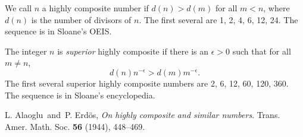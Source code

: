 \documentclass[12pt]{article}
\begin{document}
We call $n$ a highly composite number if $d(n)>d(m)$ for all $m<n$, where $d(n)$ is the number of divisors of
$n$. The first several are 1, 2, 4, 6, 12, 24. The sequence is  in Sloane's OEIS.


The integer $n$ is {\em superior} highly composite if there is an $\epsilon>0$ such that for all
$m\not=n$,
    $$d(n) n^{-\epsilon} > d(m) m^{-\epsilon}.$$
The first several superior highly composite numbers are 2, 6, 12, 60, 120, 360. The sequence is  in Sloane's encyclopedia.


\begin{thebibliography}{9}
     L. Alaoglu\ and\ P. Erd\"os, {\em On highly composite and similar numbers}. Trans. Amer. Math. Soc.
        {\bf 56} (1944), 448--469. 
\end{thebibliography}
\end{document}
